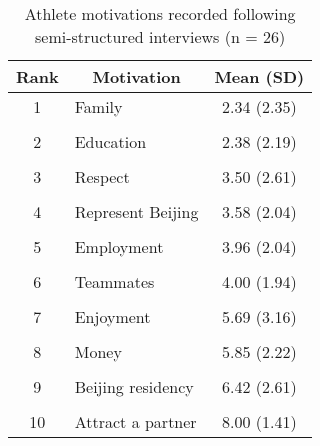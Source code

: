 \begin{table}[]
\centering
\begin{tabular}{@{}clc@{}}
\toprule
\textbf{Rank} & \multicolumn{1}{c}{\textbf{Motivation}} & \textbf{Mean (SD)} \\ \midrule
1             & Family                                  & 2.34 (2.35)        \\
	          &          	                            &        \\
2             & Education                               & 2.38 (2.19)        \\
	          &          	                            &        \\
3             & Respect                                 & 3.50 (2.61)        \\
	          &          	                            &        \\
4             & Represent Beijing                       & 3.58 (2.04)        \\
	          &          	                            &        \\
5             & Employment                              & 3.96 (2.04)        \\
	          &          	                            &        \\
6             & Teammates                               & 4.00 (1.94)        \\
	          &          	                            &        \\
7             & Enjoyment                               & 5.69 (3.16)        \\
	          &          	                            &        \\
8             & Money                                   & 5.85 (2.22)        \\
	          &          	                            &        \\
9             & Beijing residency                       & 6.42 (2.61)        \\
	          &          	                            &        \\
10            & Attract a partner                       & 8.00 (1.41)        \\ \bottomrule
\end{tabular}
\caption{Athlete motivations recorded following semi-structured interviews (n = 26)}
\label{tab:athleteMotivations}
\end{table}
